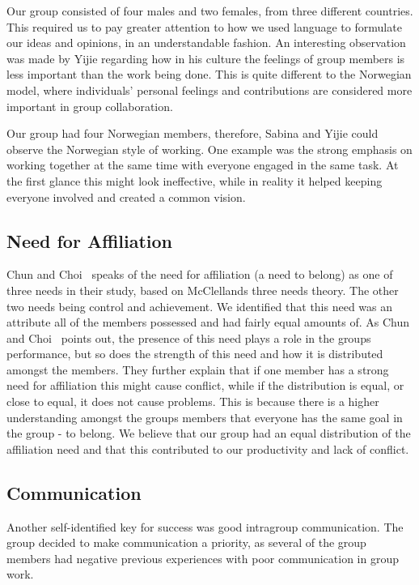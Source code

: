 Our group consisted of four males and two females, from three different countries. This required us to pay greater attention to how we used language to formulate our ideas and opinions, in an understandable fashion. An interesting observation was made by Yijie regarding how in his culture the feelings of group members is less important than the work being done. This is quite different to the Norwegian model, where individuals’ personal feelings and contributions are considered more important in group collaboration. 

Our group had four Norwegian members, therefore, Sabina and Yijie could observe the Norwegian style of working. One example was the strong emphasis on working together at the same time with everyone engaged in the same task. At the first glance this might look ineffective, while in reality it helped keeping everyone involved and created a common vision. 

\subsection{Need for Affiliation}
Chun and Choi~\cite{2014chin_and_choi} speaks of the need for affiliation (a need to belong) as one of three needs in their study, based on McClellands three needs theory. The other two needs being control and achievement. We identified that this need was an attribute all of the members possessed and had fairly equal amounts of. As Chun and Choi~\cite{2014chin_and_choi} points out, the presence of this need plays a role in the groups performance, but so does the strength of this need and how it is distributed amongst the members. They further explain that if one member has a strong need for affiliation this might cause conflict, while if the distribution is equal, or close to equal, it does not cause problems. This is because there is a higher understanding amongst the groups members that everyone has the same goal in the group - to belong. 
We believe that our group had an equal distribution of the affiliation need and that this contributed to our productivity and lack of conflict.

\subsection{Communication}
Another self-identified key for success was good intragroup communication. The group decided to make communication a priority, as several of the group members had negative previous experiences with poor communication in group work. 

